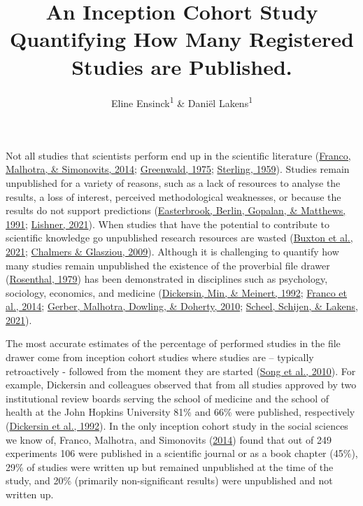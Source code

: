 \documentclass[
  ,jou, a4paper,floatsintext]{apa6}
\title{An Inception Cohort Study Quantifying How Many Registered Studies are Published.}
\author{Eline Ensinck\textsuperscript{1} \& Daniël Lakens\textsuperscript{1}}
\date{}
\affiliation{\vspace{0.5cm}\textsuperscript{1} Eindhoven University of Technology}
\begin{document}
\maketitle

Not all studies that scientists perform end up in the scientific literature (\protect\hyperlink{ref-franco_publication_2014}{Franco, Malhotra, \& Simonovits, 2014}; \protect\hyperlink{ref-greenwald_consequences_1975}{Greenwald, 1975}; \protect\hyperlink{ref-sterling_publication_1959}{Sterling, 1959}). Studies remain unpublished for a variety of reasons, such as a lack of resources to analyse the results, a loss of interest, perceived methodological weaknesses, or because the results do not support predictions (\protect\hyperlink{ref-easterbrook_publication_1991}{Easterbrook, Berlin, Gopalan, \& Matthews, 1991}; \protect\hyperlink{ref-lishner_sorting_2021}{Lishner, 2021}). When studies that have the potential to contribute to scientific knowledge go unpublished research resources are wasted (\protect\hyperlink{ref-buxton_avoiding_2021}{Buxton et al., 2021}; \protect\hyperlink{ref-chalmers_avoidable_2009}{Chalmers \& Glasziou, 2009}). Although it is challenging to quantify how many studies remain unpublished the existence of the proverbial file drawer (\protect\hyperlink{ref-rosenthal_file_1979}{Rosenthal, 1979}) has been demonstrated in disciplines such as psychology, sociology, economics, and medicine (\protect\hyperlink{ref-dickersin_factors_1992}{Dickersin, Min, \& Meinert, 1992}; \protect\hyperlink{ref-franco_publication_2014}{Franco et al., 2014}; \protect\hyperlink{ref-gerber_publication_2010}{Gerber, Malhotra, Dowling, \& Doherty, 2010}; \protect\hyperlink{ref-scheel_excess_2021}{Scheel, Schijen, \& Lakens, 2021}).

The most accurate estimates of the percentage of performed studies in the file drawer come from inception cohort studies where studies are -- typically retroactively - followed from the moment they are started (\protect\hyperlink{ref-song_dissemination_2010}{Song et al., 2010}). For example, Dickersin and colleagues observed that from all studies approved by two institutional review boards serving the school of medicine and the school of health at the John Hopkins University 81\% and 66\% were published, respectively (\protect\hyperlink{ref-dickersin_factors_1992}{Dickersin et al., 1992}). In the only inception cohort study in the social sciences we know of, Franco, Malhotra, and Simonovits (\protect\hyperlink{ref-franco_publication_2014}{2014}) found that out of 249 experiments 106 were published in a scientific journal or as a book chapter (45\%), 29\% of studies were written up but remained unpublished at the time of the study, and 20\% (primarily non-significant results) were unpublished and not written up.
\end{document}
